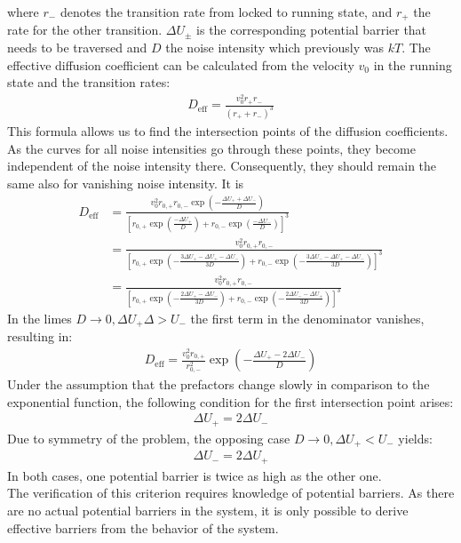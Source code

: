 \documentclass[12pt,a4paper]{article}
\begin{document}
where $r_-$ denotes the transition rate from locked to running state, and $r_+$ the rate for the other transition. $\Delta U_{\pm}$ is the corresponding potential barrier that needs to be traversed and $D$ the noise intensity which previously was $kT$. The effective diffusion coefficient can be calculated from the velocity $v_0$ in the running state and the transition rates\cite{abp}: 
\begin{align}\label{Deff}
D_{\text{eff}}=\frac{v_0^2 r_+r_-}{(r_++r_-)^3}
\end{align}
This formula allows us to find the intersection points of the diffusion coefficients. As the curves for all noise intensities go through these points, they become independent of the noise intensity there. Consequently, they should remain the same also for vanishing noise intensity.
It is
\begin{align*}
D_{\text{eff}}&=\frac{v_0^2r_{0,+}r_{0,-}\exp\left(-\frac{\Delta U_++\Delta U_-}{D}\right)}{\left[r_{0,+}\exp(\frac{-\Delta U_+}{D})+r_{0,-}\exp\left(\frac{-\Delta U_-}{D}\right)\right]^3}\\&=\frac{v_0^2r_{0,+}r_{0,-}}{\left[r_{0,+}\exp\left(-\frac{3\Delta U_+-\Delta U_+-\Delta U_-}{3D}\right)+r_{0,-}\exp\left(-\frac{3\Delta U_--\Delta U_+ -\Delta U_-}{3D}\right)\right]^3}\\&=\frac{v_0^2r_{0,+}r_{0,-}}{\left[r_{0,+}\exp\left(-\frac{2\Delta U_+-\Delta U_-}{3D}\right)+r_{0,-}\exp\left(-\frac{2\Delta U_--\Delta U_+}{3D}\right)\right]^3}
\end{align*}
In the limes $D\rightarrow 0,\Delta U_+\Delta>U_-$ the first term in the denominator vanishes, resulting in:
\begin{align*}
D_{\text{eff}}=\frac{v_0^2r_{0,+}}{r_{0,-}^2}\exp\left(-\frac{\Delta U_+-2\Delta U_-}{D}\right)
\end{align*}
Under the assumption that the prefactors change slowly in comparison to the exponential function, the following condition for the first intersection point arises:
\begin{align}\label{fcrit}
\Delta U_+=2\Delta U_-
\end{align}
Due to symmetry of the problem, the opposing case $D\rightarrow 0,\Delta U_+<U_-$ yields:
\begin{align*}
\Delta U_-=2\Delta U_+
\end{align*}
In both cases, one potential barrier is twice as high as the other one.\\
The verification of this criterion requires knowledge of potential barriers. As there are no actual potential barriers in the system, it is only possible to derive effective barriers from the behavior of the system.
\end{document}
